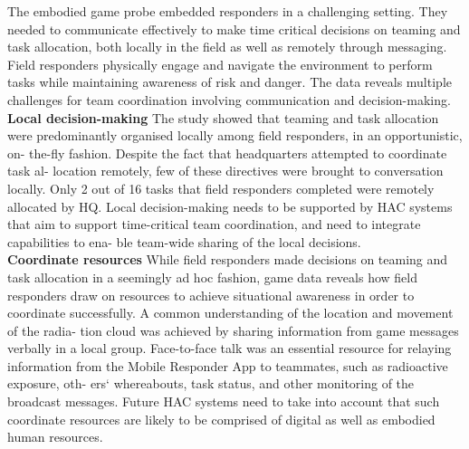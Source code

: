 The embodied game probe embedded responders in a challenging setting. They needed to communicate effectively to make time critical decisions on teaming and task allocation, both locally in the field as well as remotely through messaging. Field responders physically engage and navigate the environment to perform tasks while maintaining awareness of risk and danger. The data reveals multiple challenges for team coordination involving communication and decision-making. \\

\textbf{Local decision-making} The study showed that teaming and task allocation were predominantly organised locally among field responders, in an opportunistic, on- the-fly fashion. Despite the fact that headquarters attempted to coordinate task al- location remotely, few of these directives were brought to conversation locally. Only 2 out of 16 tasks that field responders completed were remotely allocated by HQ. Local decision-making needs to be supported by HAC systems that aim to support time-critical team coordination, and need to integrate capabilities to ena- ble team-wide sharing of the local decisions.\\

\textbf{Coordinate resources} While field responders made decisions on teaming and task allocation in a seemingly ad hoc fashion, game data reveals how field responders draw on resources to achieve situational awareness in order to coordinate successfully. A common understanding of the location and movement of the radia- tion cloud was achieved by sharing information from game messages verbally in a local group. Face-to-face talk was an essential resource for relaying information from the Mobile Responder App to teammates, such as radioactive exposure, oth- ers` whereabouts, task status, and other monitoring of the broadcast messages. Future HAC systems need to take into account that such coordinate resources are likely to be comprised of digital as well as embodied human resources. 

